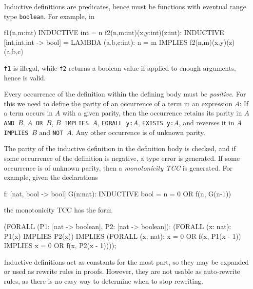 Inductive definitions are predicates, hence must be functions with
eventual range type \texttt{boolean}.  For example, in
\begin{pvsex}
  f1(n,m:int) INDUCTIVE int = n
  f2(n,m:int)(x,y:int)(z:int): INDUCTIVE [int,int,int -> bool] =
      LAMBDA (a,b,c:int): n = m IMPLIES f2(n,m)(x,y)(z)(a,b,c)
\end{pvsex}
\texttt{f1} is illegal, while \texttt{f2} returns a boolean value if
applied to enough arguments, hence is valid.

Every occurrence of the definition within the defining body must be
\emph{positive}. For this we need to define the
parity of an occurrence of a term in an expression $A$: If a term occurs
in $A$ with a given parity, then the occurrence retains its parity in
\texttt{$A$ AND $B$}, \texttt{$A$ OR $B$}, \texttt{$B$ IMPLIES $A$},
\texttt{FORALL y:$A$}, \texttt{EXISTS y:$A$}, and reverses it in
\texttt{$A$ IMPLIES $B$} and \texttt{NOT $A$}.  Any other occurrence is of
unknown parity.

The parity of the inductive definition in the definition body is checked,
and if some occurrence of the definition is negative, a type error is
generated.  If some occurrence is of unknown parity, then a
\emph{monotonicity TCC} is
generated.  For example, given the declarations
\begin{pvsex}
  f: [nat, bool -> bool]
  G(n:nat): INDUCTIVE bool =
    n = 0 OR f(n, G(n-1))
\end{pvsex}
the monotonicity TCC has the form
\begin{pvsex}
  (FORALL (P1: [nat -> boolean], P2: [nat -> boolean]):
     (FORALL (x: nat): P1(x) IMPLIES P2(x))
         IMPLIES
       (FORALL (x: nat):
          x = 0 OR f(x, P1(x - 1)) IMPLIES x = 0 OR f(x, P2(x - 1))));
\end{pvsex}

Inductive definitions act as constants for the most part, so they may be
expanded or used as rewrite rules in proofs.  However, they are not usable
as auto-rewrite rules, as there is no easy way to determine when to stop
rewriting.

